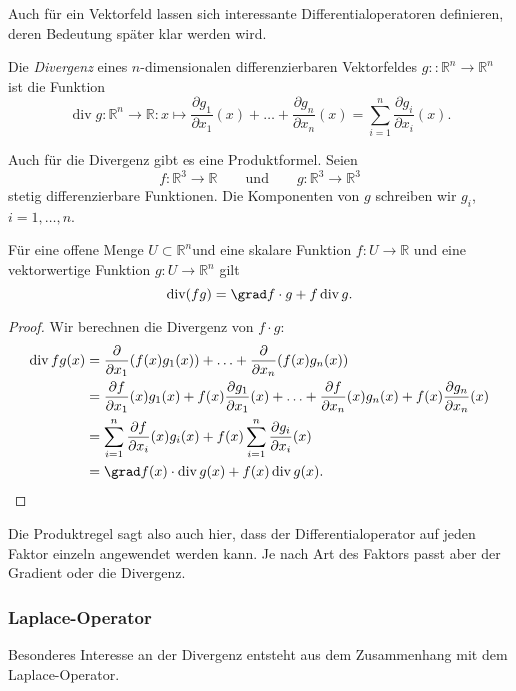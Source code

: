 Auch für ein Vektorfeld lassen sich interessante Differentialoperatoren
definieren, deren Bedeutung später klar werden wird.

\begin{definition}[Divergenz]
\label{buch:felder:fundamentallemme:def:divergenz}
Die {\em Divergenz} eines $n$-dimensionalen differenzierbaren
Vektorfeldes $g\colon:\mathbb{R}^n\to\mathbb{R}^n$ ist die Funktion
\[
\operatorname{div} g
\colon
\mathbb{R}^n\to\mathbb{R}
:
x \mapsto
\frac{\partial g_1}{\partial x_1}(x)
+\ldots+
\frac{\partial g_n}{\partial x_n}(x)
=
\sum_{i=1}^n
\frac{\partial g_i}{\partial x_i}(x).
\]
\end{definition}

Auch für die Divergenz gibt es eine Produktformel.
Seien
\[
f\colon\mathbb{R}^3\to\mathbb{R}
\qquad\text{und}\qquad
g\colon\mathbb{R}^3\to\mathbb{R}^3
\]
stetig differenzierbare Funktionen.
Die Komponenten von $g$ schreiben wir $g_i$, $i=1,\dots,n$.

\begin{satz}
Für eine offene Menge $U\subset\mathbb{R}^n$und
eine skalare Funktion $f\colon U\to\mathbb{R}$ und
eine vektorwertige Funktion $g\colon U\to\mathbb{R}^n$ gilt
\[
\operatorname{div}(fg)
=
\grad f \cdot g
+
f\operatorname{div}g.
\]
\end{satz}

\begin{proof}
Wir berechnen die Divergenz von $f\cdot g$:
\begin{align*}
\operatorname{div} fg(x)
&=
\frac{\partial}{\partial x_1}(f(x)g_1(x))
+
\ldots
+
\frac{\partial}{\partial x_n}(f(x)g_n(x))
\\
&=
\frac{\partial f}{\partial x_1}(x)g_1(x)
+f(x)\frac{\partial g_1}{\partial x_1}(x)
+
\ldots
+
\frac{\partial f}{\partial x_n}(x)g_n(x)
+f(x)\frac{\partial g_n}{\partial x_n}(x)
\\
&=
\sum_{i=1}^n \frac{\partial f}{\partial x_i}(x) g_i(x)
+
f(x)
\sum_{i=1}^n \frac{\partial g_i}{\partial x_i}(x)
\\
&=
\grad f(x)\cdot \operatorname{div} g(x)
+
f(x)\operatorname{div}g(x).
\qedhere
\end{align*}
\end{proof}

Die Produktregel sagt also auch hier, dass der Differentialoperator
auf jeden Faktor einzeln angewendet werden kann. 
Je nach Art des Faktors passt aber der Gradient oder die Divergenz.

%
%
\subsubsection{Laplace-Operator}
Besonderes Interesse an der Divergenz entsteht aus dem Zusammenhang
mit dem Laplace-Operator.


